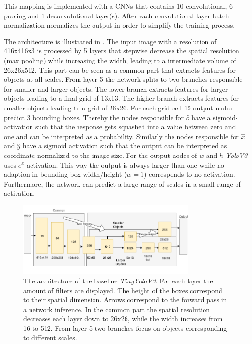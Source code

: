	This mapping is implemented with a \acp{CNN} that contains 10 convolutional, 6 pooling and 1 deconvolutional layer(s). After each convolutional layer batch normalization normalizes the output in order to simplify the training process.
	
	The architecture is illustrated in . The input image with a resolution of 416x416x3 is processed by 5 layers that stepwise decrease the spatial resolution (max pooling) while increasing the width, leading to a intermediate volume of 26x26x512. This part can be seen as a common part that extracts features for objects at all scales. From layer 5 the network splits to two branches responsible for smaller and larger objects. The lower branch extracts features for larger objects leading to a final grid of 13x13. The higher branch extracts features for smaller objects leading to a grid of 26x26. For each grid cell 15 output nodes predict 3 bounding boxes. Thereby the nodes responsible for $\hat o$ have a sigmoid-activation such that the response gets squashed into a value between zero and one and can be interpreted as a probability. Similarly the nodes responsible for $\hat x$ and $\hat y$ have a sigmoid activation such that the output can be interpreted as coordinate normalized to the image size. For the output nodes of $w$ and $h$ \textit{YoloV3} uses $e^x$-activation. This way the output is always larger than one while no adaption in bounding box width/height ($w=1$) corresponds to no activation. Furthermore, the network can predict a large range of scales in a small range of activation.
			
	\begin{figure}[hbtp]
		\centering
		\includegraphics[width=0.8\textwidth]{fig/tinyyolov3_arch}
		\caption{The architecture of the baseline \textit{TinyYoloV3}. For each layer the amount of filters are displayed. The height of the boxes correspond to their spatial dimension. Arrows correspond to the forward pass in a network inference. In the common part the spatial resolution decreases each layer down to 26x26, while the width increases from 16 to 512. From layer 5 two branches focus on objects corresponding to different scales. }
		\label{fig:tinyyolov3_arch}
	\end{figure}
	

